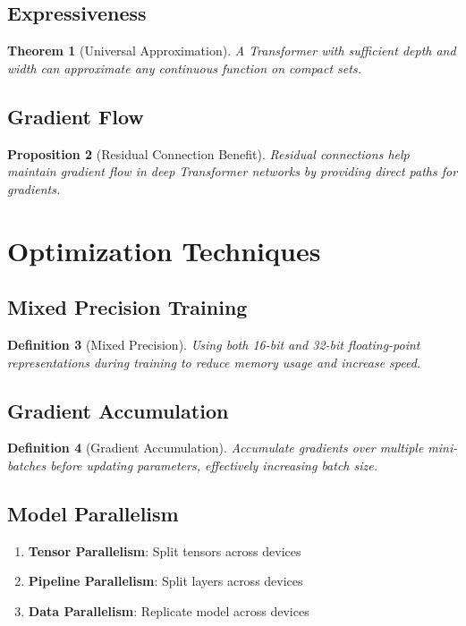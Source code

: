 \documentclass[11pt,a4paper]{article}
\newtheorem{theorem}{Theorem}[section]
\newtheorem{proposition}[theorem]{Proposition}
\newtheorem{definition}[theorem]{Definition}
\begin{document}
\subsection{Expressiveness}

\begin{theorem}[Universal Approximation]
A Transformer with sufficient depth and width can approximate any continuous function on compact sets.
\end{theorem}

\subsection{Gradient Flow}

\begin{proposition}[Residual Connection Benefit]
Residual connections help maintain gradient flow in deep Transformer networks by providing direct paths for gradients.
\end{proposition}

\section{Optimization Techniques}

\subsection{Mixed Precision Training}

\begin{definition}[Mixed Precision]
Using both 16-bit and 32-bit floating-point representations during training to reduce memory usage and increase speed.
\end{definition}

\subsection{Gradient Accumulation}

\begin{definition}[Gradient Accumulation]
Accumulate gradients over multiple mini-batches before updating parameters, effectively increasing batch size.
\end{definition}

\subsection{Model Parallelism}

\begin{enumerate}
\item \textbf{Tensor Parallelism}: Split tensors across devices
\item \textbf{Pipeline Parallelism}: Split layers across devices
\item \textbf{Data Parallelism}: Replicate model across devices
\end{enumerate}
\end{document}
